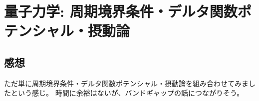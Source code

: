 \documentclass[../../sp_2014.tex]{subfiles}
\begin{document}
\section{量子力学: 周期境界条件・デルタ関数ポテンシャル・摂動論}
\subsection{}


\subsection*{感想}
ただ単に周期境界条件・デルタ関数ポテンシャル・摂動論を組み合わせてみましたという感じ。
時間に余裕はないが、バンドギャップの話につながりそう。
\end{document}
